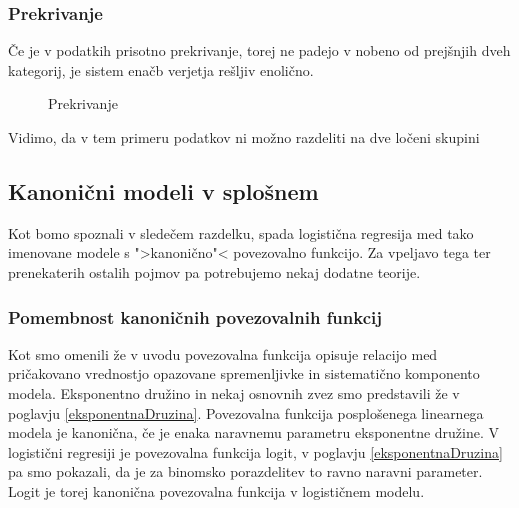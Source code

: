 \documentclass[12pt,a4paper]{amsart}
\theoremstyle{definition} %
\theoremstyle{plain} %
\begin{document}
\subsubsection{Prekrivanje}
Če je v podatkih prisotno prekrivanje, torej ne padejo v nobeno od prejšnjih dveh kategorij, je sistem enačb verjetja rešljiv enolično.
\begin{center}
    \begin{figure}[h!]
    \caption{Prekrivanje}
\end{figure}
\end{center}
Vidimo, da v tem primeru podatkov ni možno razdeliti na dve ločeni skupini

\subsection{Kanonični modeli v splošnem}
Kot bomo spoznali v sledečem razdelku, spada logistična regresija med tako imenovane modele s ">kanonično"< povezovalno funkcijo. 
Za vpeljavo tega ter prenekaterih ostalih pojmov pa potrebujemo nekaj dodatne teorije.

\subsubsection{Pomembnost kanoničnih povezovalnih funkcij}\label{kan}
Kot smo omenili že v uvodu povezovalna funkcija opisuje relacijo med pričakovano vrednostjo opazovane spremenljivke in
sistematično komponento modela. Eksponentno družino in nekaj osnovnih zvez smo predstavili že v poglavju \ref{eksponentnaDruzina}.
Povezovalna funkcija posplošenega linearnega modela je kanonična, če je enaka naravnemu parametru eksponentne družine. V logistični regresiji je povezovalna funkcija logit,
v poglavju \ref{eksponentnaDruzina} pa smo pokazali, da je za binomsko porazdelitev to ravno naravni parameter. Logit je torej kanonična povezovalna funkcija v logističnem modelu.
\end{document}
